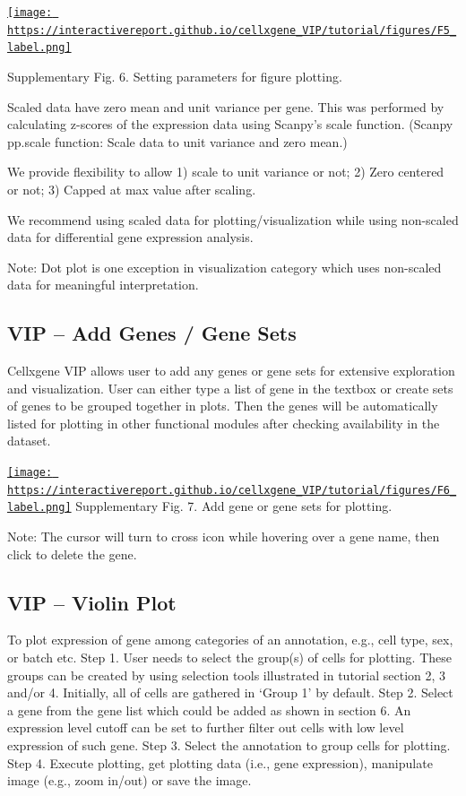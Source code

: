 \documentclass[
]{article}
\begin{document}
\href{https://interactivereport.github.io/cellxgene_VIP/tutorial/figures/F5_label.png}{\texttt{[image: https://interactivereport.github.io/cellxgene\_VIP/tutorial/figures/F5\_label.png]}}

Supplementary Fig. 6. Setting parameters for figure plotting.

Scaled data have zero mean and unit variance per gene. This was performed by calculating z-scores of the expression data using Scanpy's scale function. (Scanpy pp.scale function: Scale data to unit variance and zero mean.)

We provide flexibility to allow 1) scale to unit variance or not; 2) Zero centered or not; 3) Capped at max value after scaling.

We recommend using scaled data for plotting/visualization while using non-scaled data for differential gene expression analysis.

Note: Dot plot is one exception in visualization category which uses non-scaled data for meaningful interpretation.

\hypertarget{vip-add-genes-gene-sets}{%
\subsection{VIP -- Add Genes / Gene Sets}\label{vip-add-genes-gene-sets}}

Cellxgene VIP allows user to add any genes or gene sets for extensive exploration and visualization. User can either type a list of gene in the textbox or create sets of genes to be grouped together in plots. Then the genes will be automatically listed for plotting in other functional modules after checking availability in the dataset.

\href{https://interactivereport.github.io/cellxgene_VIP/tutorial/figures/F6_label.png}{\texttt{[image: https://interactivereport.github.io/cellxgene\_VIP/tutorial/figures/F6\_label.png]}}
Supplementary Fig. 7. Add gene or gene sets for plotting.

Note: The cursor will turn to cross icon while hovering over a gene name, then click to delete the gene.

\hypertarget{vip-violin-plot}{%
\subsection{VIP -- Violin Plot}\label{vip-violin-plot}}

To plot expression of gene among categories of an annotation, e.g., cell type, sex, or batch etc.
Step 1. User needs to select the group(s) of cells for plotting. These groups can be created by using selection tools illustrated in tutorial section 2, 3 and/or 4. Initially, all of cells are gathered in `Group 1' by default.
Step 2. Select a gene from the gene list which could be added as shown in section 6. An expression level cutoff can be set to further filter out cells with low level expression of such gene.
Step 3. Select the annotation to group cells for plotting.
Step 4. Execute plotting, get plotting data (i.e., gene expression), manipulate image (e.g., zoom in/out) or save the image.
\end{document}
